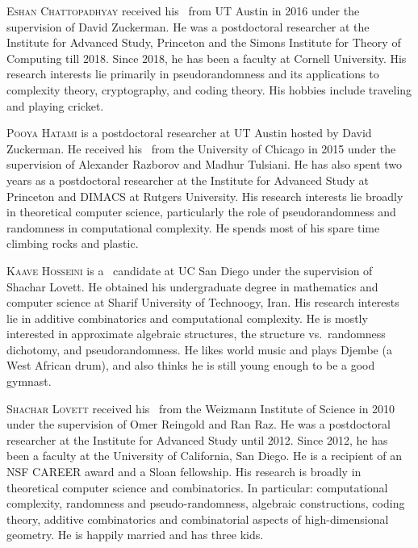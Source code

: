 \documentclass{toc}
\begin{document}
%
%
%
%
%
%
%
%
%
%
%
%
%
%
\begin{tocaboutauthors}
\begin{tocabout}[chattopadhyay]  %
\textsc{Eshan Chattopadhyay} received his \phd\ from UT Austin in 2016 under
the supervision of  David Zuckerman. He was a postdoctoral researcher
at the Institute for Advanced Study, Princeton and the Simons
Institute for Theory of Computing till 2018. Since 2018, he has been a
faculty at Cornell University. His research interests lie primarily in
pseudorandomness and its applications to  complexity theory,
cryptography, and coding theory. His hobbies include traveling and
playing cricket.
\end{tocabout}
\begin{tocabout}[hatami]
\textsc{Pooya Hatami} is a postdoctoral researcher at UT Austin
hosted by David Zuckerman. He received his \phd\ from the
University of Chicago in
2015 under the supervision of Alexander Razborov and Madhur Tulsiani.
He has also spent two years as a postdoctoral researcher
%
at   %
the Institute for Advanced Study at Princeton and DIMACS at Rutgers
University. His research interests lie broadly in theoretical computer
science, particularly the role of pseudorandomness and randomness in
computational complexity. He spends most of his spare time climbing
rocks and plastic.
\end{tocabout}


\begin{tocabout}[hosseini]
\textsc{Kaave Hosseini} is a \phd\ candidate at UC San Diego under
the %
supervision of Shachar Lovett.  He obtained his undergraduate degree
in mathematics and computer science at Sharif
%
University of Technoogy,    %
Iran. His research interests lie in additive combinatorics and computational
complexity.
%
He is   %
mostly interested in approximate algebraic structures,
the    %
structure vs.\ randomness dichotomy,
and pseudorandomness. He likes world music and plays Djembe
(a West African drum), and also thinks
he is still young enough to be a good gymnast.
\end{tocabout}

\begin{tocabout}[lovett]
\textsc{Shachar Lovett} received his \phd\ from the
Weizmann Institute of Science in 2010 under the supervision of
Omer Reingold and Ran Raz. He was a postdoctoral researcher at
the Institute for Advanced Study until 2012. Since 2012, he has been
a faculty at the University of California, San Diego. He is a
recipient of an NSF CAREER award and a Sloan fellowship.
His research is broadly in theoretical computer science and
combinatorics. In particular: computational complexity, randomness and
pseudo-randomness,
algebraic constructions, coding theory, additive combinatorics and
combinatorial aspects of high-dimensional geometry.
He is happily married and has three kids.
\end{tocabout}

\end{tocaboutauthors}
\end{document}

